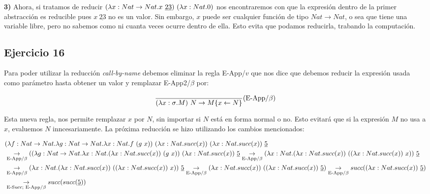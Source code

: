 \documentclass[10pt,a4paper, landscape]{article}
\begin{document}
\begin{multicols}{2}
\textbf{3)} Ahora, si tratamos de reducir $(\lambda x:  Nat\to Nat \text{.} x~\underline{23})~(\lambda x:  Nat \text{.} 0)$ nos encontraremos con que la expresión dentro de la primer abstracción es reducible pues $x~\underline{23}$ no es un valor. Sin embargo,  $x$ puede ser cualquier función de tipo  $ Nat\to Nat$, o sea que tiene una variable libre, pero no sabemos como ni cuanta veces ocurre dentro de ella. Esto evita que podamos reducirla, trabando la computación.
\end{multicols}


\newpage
\subsection{Ejercicio 16}
\begin{multicols}{2}
Para poder utilizar la reducción \textit{call-by-name} debemos eliminar la regla E-App/$v$ que nos dice que debemos reducir la expresión usada como parámetro hasta obtener un valor y remplazar E-App2/$\beta$ por:
\vfil

$$\frac{}{(\lambda x: \sigma \text{.} M)~N \to M\{x\leftarrow N\}}(\text{E-App/}\beta)$$

Esta nueva regla, nos permite remplazar $x$ por $N$, sin importar si $N$ está en forma normal o no. Esto evitará que si la expresión $M$ no usa a $x$, evaluemos $N$ inncesariamente. La próxima reducción se hizo utilizando los cambios mencionados:
\end{multicols}

\begin{equation*}
\begin{split}
&(\lambda f:  Nat\to Nat \text{.} \lambda g:  Nat\to Nat \text{.} \lambda x:  Nat \text{.} f~(g~x))~(\lambda x:  Nat \text{.} succ(x))~(\lambda x:  Nat \text{.} succ(x))~\underline{5} \\
    &\underset{\text{E-App}/\beta}{\to} ((\lambda g:  Nat\to Nat \text{.} \lambda x:  Nat \text{.} (\lambda x:  Nat \text{.} succ(x))~(g~x))~(\lambda x:  Nat \text{.} succ(x))~\underline{5}
\underset{\text{E-App}/\beta}{\to} (\lambda x:  Nat \text{.} (\lambda x:  Nat \text{.} succ(x))~((\lambda x:  Nat \text{.} succ(x))~x))~\underline{5}\\
&\underset{\text{E-App}/\beta}{\to} (\lambda x:  Nat \text{.} (\lambda x:  Nat \text{.} succ(x))~((\lambda x:  Nat \text{.} succ(x))~x))~\underline{5} 
\underset{\text{E-App}/\beta}{\to} (\lambda x:  Nat \text{.} succ(x))~((\lambda x:  Nat \text{.} succ(x))~\underline{5})
\underset{\text{E-App}/\beta}{\to} succ((\lambda x:  Nat \text{.} succ(x))~\underline{5}) \\
&\underset{\text{E-Succ; E-App}/\beta}{\to} succ(succ(\underline{5})) 
\end{split}
\end{equation*}
\end{document}
